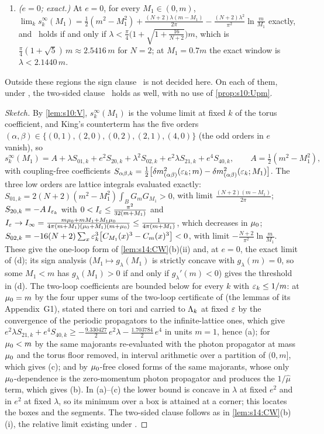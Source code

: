 \begin{proposition}
\begin{enumerate}[label=\textup{(\alph*)},leftmargin=*]
\item \emph{($e=0$; exact.)} At $e=0$, for every $M_1\in(0,m)$, $\lim_ks^\infty_k(M_1)=\frac12(m^2-M_1^2)+\frac{(N+2)\lambda(m-M_1)}{2\pi}-\frac{(N+2)\lambda^2}{\pi^2}\ln\frac m{M_1}$ exactly, and \Tthree\ holds if and only if $\lambda<\frac\pi4\big(1+\sqrt{1+\frac{16}{N+2}}\big)m$, which is $\frac\pi4(1+\sqrt5)\,m\approx2.5416\,m$ for $N=2$; at $M_1=0.7m$ the exact window is $\lambda<2.1440\,m$.
\end{enumerate}
Outside these regions the sign clause \Tthree\ is not decided here. On each of them, under \sxivCT, the two-sided clause \sxivNE\ holds as well, with no use of \cref{prop:s10:Upm}.
\end{proposition}

\begin{proof}[Sketch]
By \cref{lem:s10:V}, $s^\infty_k(M_1)$ is the volume limit at fixed $k$ of the torus coefficient, and King's counterterm has the five orders $(\alpha,\beta)\in\{(0,1),(2,0),(0,2),(2,1),(4,0)\}$ (the odd orders in $e$ vanish), so
\[
s^\infty_k(M_1)=A+\lambda S_{01,k}+e^2S_{20,k}+\lambda^2S_{02,k}+e^2\lambda S_{21,k}+e^4S_{40,k},\qquad A=\tfrac12(m^2-M_1^2),
\]
with coupling-free coefficients $S_{\alpha\beta,k}=\frac12\big[\delta m^2_{(\alpha\beta)}(\varepsilon_k;m)-\delta m^2_{(\alpha\beta)}(\varepsilon_k;M_1)\big]$. The three low orders are lattice integrals evaluated exactly: $S_{01,k}=2(N+2)(m^2-M_1^2)\int_BG_mG_{M_1}>0$, with limit $\frac{(N+2)(m-M_1)}{2\pi}$; $S_{20,k}=-A\,I_{\varepsilon_k}$ with $0<I_{\varepsilon}\le\frac{\pi^2}{32(m+M_1)}$ and $I_{\varepsilon}\to I_\infty=\frac{m\mu_0+mM_1+M_1\mu_0}{4\pi(m+M_1)(\mu_0+M_1)(m+\mu_0)}\le\frac1{4\pi(m+M_1)}$, which decreases in $\mu_0$; $S_{02,k}=-16(N+2)\sum_x\varepsilon_k^3\big[C_{M_1}(x)^3-C_m(x)^3\big]<0$, with limit $-\frac{N+2}{\pi^2}\ln\frac m{M_1}$. These give the one-loop form of \cref{lem:s14:CW}(b)(ii) and, at $e=0$, the exact limit of (d); its sign analysis ($M_1\mapsto g_\lambda(M_1)$ is strictly concave with $g_\lambda(m)=0$, so some $M_1<m$ has $g_\lambda(M_1)>0$ if and only if $g_\lambda'(m)<0$) gives the threshold in (d). The two-loop coefficients are bounded below for every $k$ with $\varepsilon_k\le1/m$: at $\mu_0=m$ by the four upper sums of the two-loop certificate of \cite{SymPhase} (the lemmas of its Appendix~G1), stated there on tori and carried to $\Lambda_k$ at fixed $\varepsilon$ by the convergence of the periodic propagators to the infinite-lattice ones, which give $e^2\lambda S_{21,k}+e^4S_{40,k}\ge-\frac{9.330427}2\,e^2\lambda-\frac{1.703784}2\,e^4$ in units $m=1$, hence (a); for $\mu_0<m$ by the same majorants re-evaluated with the photon propagator at mass $\mu_0$ and the torus floor removed, in interval arithmetic over a partition of $(0,m]$, which gives (c); and by $\mu_0$-free closed forms of the same majorants, whose only $\mu_0$-dependence is the zero-momentum photon propagator and produces the $1/\hat\mu$ term, which gives (b). In (a)--(c) the lower bound is concave in $\lambda$ at fixed $e^2$ and in $e^2$ at fixed $\lambda$, so its minimum over a box is attained at a corner; this locates the boxes and the segments. The two-sided clause follows as in \cref{lem:s14:CW}(b)(i), the relative limit existing under \sxivCT.

\end{proof}
